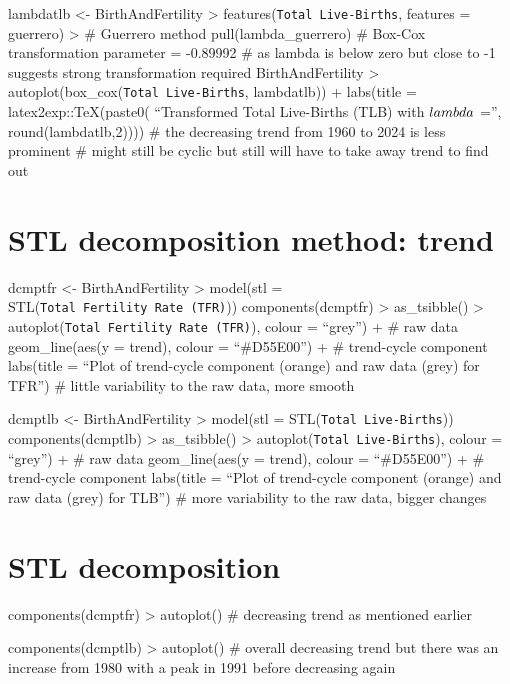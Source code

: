\documentclass[
]{article}
\begin{document}
lambdatlb \textless- BirthAndFertility \textbar\textgreater{}
features(\texttt{Total\ Live-Births}, features = guerrero)
\textbar\textgreater{} \# Guerrero method pull(lambda\_guerrero) \#
Box-Cox transformation parameter = -0.89992 \# as lambda is below zero
but close to -1 suggests strong transformation required
BirthAndFertility \textbar\textgreater{}
autoplot(box\_cox(\texttt{Total\ Live-Births}, lambdatlb)) + labs(title
= latex2exp::TeX(paste0( ``Transformed Total Live-Births (TLB) with
\(\\lambda\) ='', round(lambdatlb,2)))) \# the decreasing trend from
1960 to 2024 is less prominent \# might still be cyclic but still will
have to take away trend to find out

\section{STL decomposition method:
trend}\label{stl-decomposition-method-trend}

dcmptfr \textless- BirthAndFertility \textbar\textgreater{} model(stl =
STL(\texttt{Total\ Fertility\ Rate\ (TFR)})) components(dcmptfr)
\textbar\textgreater{} as\_tsibble() \textbar\textgreater{}
autoplot(\texttt{Total\ Fertility\ Rate\ (TFR)}), colour = ``grey'') +
\# raw data geom\_line(aes(y = trend), colour = ``\#D55E00'') + \#
trend-cycle component labs(title = ``Plot of trend-cycle component
(orange) and raw data (grey) for TFR'') \# little variability to the raw
data, more smooth

dcmptlb \textless- BirthAndFertility \textbar\textgreater{} model(stl =
STL(\texttt{Total\ Live-Births})) components(dcmptlb)
\textbar\textgreater{} as\_tsibble() \textbar\textgreater{}
autoplot(\texttt{Total\ Live-Births}), colour = ``grey'') + \# raw data
geom\_line(aes(y = trend), colour = ``\#D55E00'') + \# trend-cycle
component labs(title = ``Plot of trend-cycle component (orange) and raw
data (grey) for TLB'') \# more variability to the raw data, bigger
changes

\section{STL decomposition}\label{stl-decomposition}

components(dcmptfr) \textbar\textgreater{} autoplot() \# decreasing
trend as mentioned earlier

components(dcmptlb) \textbar\textgreater{} autoplot() \# overall
decreasing trend but there was an increase from 1980 with a peak in 1991
before decreasing again
\end{document}
